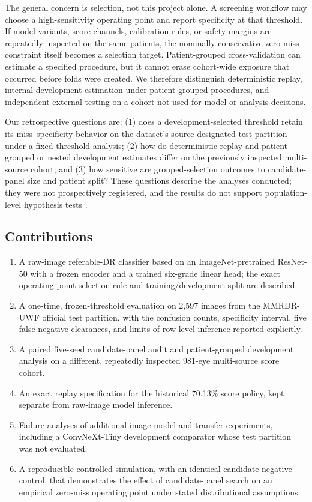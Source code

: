 \documentclass{ieeeaccess}
\begin{document}
The general concern is selection, not this project alone. A screening workflow may choose a high-sensitivity operating point and report specificity at that threshold. If model variants, score channels, calibration rules, or safety margins are repeatedly inspected on the same patients, the nominally conservative zero-miss constraint itself becomes a selection target. Patient-grouped cross-validation can estimate a specified procedure, but it cannot erase cohort-wide exposure that occurred before folds were created. We therefore distinguish deterministic replay, internal development estimation under patient-grouped procedures, and independent external testing on a cohort not used for model or analysis decisions.

Our retrospective questions are: (1) does a development-selected threshold retain its miss--specificity behavior on the dataset's source-designated test partition under a fixed-threshold analysis; (2) how do deterministic replay and patient-grouped or nested development estimates differ on the previously inspected multi-source cohort; and (3) how sensitive are grouped-selection outcomes to candidate-panel size and patient split? These questions describe the analyses conducted; they were not prospectively registered, and the results do not support population-level hypothesis tests \cite{openaiChatGPT}.

\subsection{Contributions}
\begin{enumerate}
\item A raw-image referable-DR classifier based on an ImageNet-pretrained ResNet-50 with a frozen encoder and a trained six-grade linear head; the exact operating-point selection rule and training/development split are described.
\item A one-time, frozen-threshold evaluation on 2,597 images from the MMRDR-UWF official test partition, with the confusion counts, specificity interval, five false-negative clearances, and limits of row-level inference reported explicitly.
\item A paired five-seed candidate-panel audit and patient-grouped development analysis on a different, repeatedly inspected 981-eye multi-source score cohort.
\item An exact replay specification for the historical 70.13\% score policy, kept separate from raw-image model inference.
\item Failure analyses of additional image-model and transfer experiments, including a ConvNeXt-Tiny development comparator whose test partition was not evaluated.
\item A reproducible controlled simulation, with an identical-candidate negative control, that demonstrates the effect of candidate-panel search on an empirical zero-miss operating point under stated distributional assumptions.
\end{enumerate}
\end{document}
